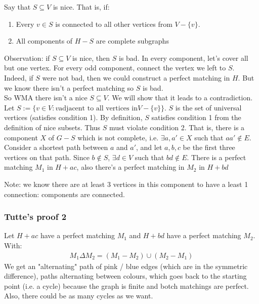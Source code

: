 \documentclass[11pt]{book}
\begin{document}
		Say that $S \subseteq V$ is nice. That is, if:
		\begin{enumerate}
			\item Every $v \in S$ is connected to all other vertices from $V - \{ v \}$.
			\item All components of $H - S$ are complete subgraphs
		\end{enumerate}
		Observation: if $S \subseteq V$ is nice, then $S$ is bad. In every component, let's cover all but one vertex. For every odd component, connect the vertex we left to $S$. Indeed, if $S$ were not bad, then we could construct a perfect matching in $H$. But we know there isn't a perfect matching so $S$ is bad.\\
		
		So WMA there isn't a nice $S \subseteq V$. We will show that it leads to a contradiction. Let $S := \{ v \in V : v \text{adjacent to all vertices in} V - \{ v \} \}$. $S$ is the set of universal vertices (satisfies condition 1). By definition, $S$ satisfies condition 1 from the definition of nice subsets. Thus $S$ must violate condition 2. That is, there is a component $X$ of $G - S$ which is not complete, i.e. $\exists a, a' \in X$ such that $aa' \notin E$. Consider a shortest path between $a$ and $a'$, and let $a, b, c$ be the first three vertices on that path. Since $b \notin S$, $\exists d \in V$ such that $bd \notin E$. There is a perfect matching $M_1$ in $H + ac$, also there's a perfect matching in $M_2$ in $H + bd$ 
		
		Note: we know there are at least 3 vertices in this component to have a least 1 connection: components are connected.

		\subsubsection{Tutte's proof 2}
			Let $H + ac$ have a perfect matching $M_1$ and $H + bd $ have a perfect matching $M_2$.
			With:
			\begin{eqnarray}
				M_1 \Delta M_2 = (M_1 - M_2) \cup (M_2 - M_1)
			\end{eqnarray}
			We get an "alternating" path of pink / blue edges (which are in the symmetric difference), paths alternating between colours, which goes back to the starting point (i.e. a cycle) because the graph is finite and botch matchings are perfect. Also, there could be as many cycles as we want. \\
			
\end{document}
